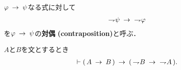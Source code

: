 	\begin{screen}
		\begin{dfn}[対偶]
			$\varphi \rarrow \psi$なる式に対して
			\begin{align}
				\negation \psi \rarrow\ \negation \varphi
			\end{align}
			を$\varphi \rarrow \psi$の{\bf 対偶}
			{\bf (contraposition)}と呼ぶ．
		\end{dfn}
	\end{screen}
	
	\begin{screen}
		\begin{logicalthm}[対偶命題が導かれる]
		\label{logicalthm:introduction_of_contraposition}
			$A$と$B$を文とするとき
			\begin{align}
				\vdash (\, A \rarrow B\, ) 
				\rarrow (\, \negation B \rarrow\ \negation A\, ).
			\end{align}
		\end{logicalthm}
	\end{screen}
	

